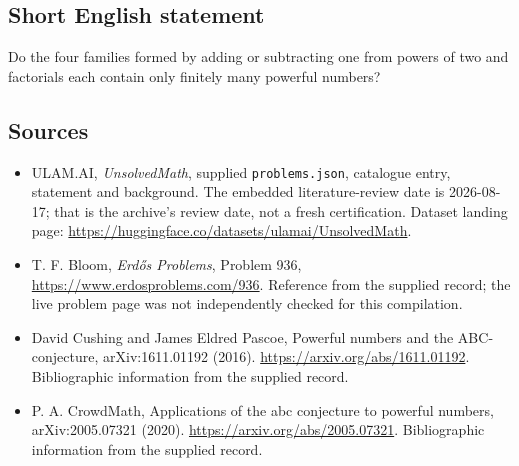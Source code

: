 \documentclass[11pt,a4paper]{article}
\begin{document}
\subsection{Short English statement}

Do the four families formed by adding or subtracting one from powers of two and factorials each contain only finitely many powerful numbers?

\subsection{Sources}

{\small

\begin{itemize}

\item[\hypertarget{source:statement:1}{S1}] ULAM.AI, \emph{UnsolvedMath}, supplied \texttt{problems.json}, catalogue entry, statement and background. The embedded literature-review date is 2026-08-17; that is the archive’s review date, not a fresh certification. Dataset landing page: \url{https://huggingface.co/datasets/ulamai/UnsolvedMath}.

\item[\hypertarget{source:statement:2}{S2}] T. F. Bloom, \emph{Erdős Problems}, Problem 936, \url{https://www.erdosproblems.com/936}. Reference from the supplied record; the live problem page was not independently checked for this compilation.

\item[\hypertarget{source:statement:3}{S3}] David Cushing and James Eldred Pascoe, Powerful numbers and the ABC-conjecture, arXiv:1611.01192 (2016). \url{https://arxiv.org/abs/1611.01192}. Bibliographic information from the supplied record.

\item[\hypertarget{source:statement:4}{S4}] P. A. CrowdMath, Applications of the abc conjecture to powerful numbers, arXiv:2005.07321 (2020). \url{https://arxiv.org/abs/2005.07321}. Bibliographic information from the supplied record.

\end{itemize}

}

\label{end:statement}
\end{document}
